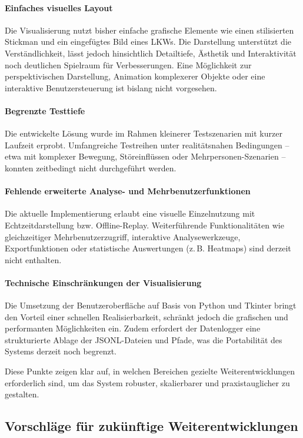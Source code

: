 \documentclass[a4paper, 12pt]{article} %
\begin{document}
\paragraph{Einfaches visuelles Layout}
Die Visualisierung nutzt bisher einfache grafische Elemente wie einen stilisierten Stickman und ein eingefügtes Bild eines \ac{LKW}s. 
Die Darstellung unterstützt die Verständlichkeit, lässt jedoch hinsichtlich Detailtiefe, Ästhetik und Interaktivität noch deutlichen Spielraum 
für Verbesserungen. Eine Möglichkeit zur perspektivischen Darstellung, Animation komplexerer Objekte oder eine interaktive Benutzersteuerung ist 
bislang nicht vorgesehen.

\paragraph{Begrenzte Testtiefe}
Die entwickelte Lösung wurde im Rahmen kleinerer Testszenarien mit kurzer Laufzeit erprobt. Umfangreiche Testreihen unter realitätsnahen 
Bedingungen – etwa mit komplexer Bewegung, Störeinflüssen oder Mehrpersonen-Szenarien – konnten zeitbedingt nicht durchgeführt werden.

\paragraph{Fehlende erweiterte Analyse- und Mehrbenutzerfunktionen}
Die aktuelle Implementierung erlaubt eine visuelle Einzelnutzung mit Echtzeitdarstellung bzw. Offline-Replay. Weiterführende Funktionalitäten wie 
gleichzeitiger Mehrbenutzerzugriff, interaktive Analysewerkzeuge, Exportfunktionen oder statistische Auswertungen (z.\,B. Heatmaps) sind derzeit nicht 
enthalten.

\paragraph{Technische Einschränkungen der Visualisierung}
Die Umsetzung der Benutzeroberfläche auf Basis von Python und Tkinter bringt den Vorteil einer schnellen Realisierbarkeit, schränkt jedoch die 
grafischen und performanten Möglichkeiten ein. Zudem erfordert der Datenlogger eine strukturierte Ablage der \ac{JSONL}-Dateien und Pfade, was die 
Portabilität des Systems derzeit noch begrenzt.

Diese Punkte zeigen klar auf, in welchen Bereichen gezielte Weiterentwicklungen erforderlich sind, um das System robuster, skalierbarer und 
praxistauglicher zu gestalten.

\subsection{Vorschläge für zukünftige Weiterentwicklungen}
\end{document}

